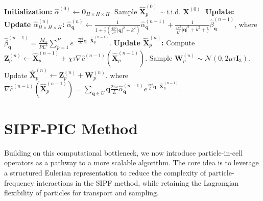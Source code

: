 \documentclass[review,onefignum,onetabnum]{siamart250211}
\begin{document}
\begin{algorithm}
\caption{The SIPF method developed in \cite{SIPF1}}\label{Alg:SIPF}
\begin{algorithmic}[1]
\State \textbf{Initialization:}
\State \(\hat{\alpha}^{(0)} \gets \mathbf{0}_{H \times H \times H}\). 
\State Sample \(\widehat{\mathbf{X}}_p^{(0)} \sim \text{i.i.d. } \mathbf{X}^{(0)}\). 
\Statex
\State \textbf{Update:}
    \State \textbf{Update \(\hat{\alpha}^{(n)}_{H \times H \times H}\):}
    \State \(\hat{\alpha}_{\mathbf{q}}^{(n)} \gets \frac{1}{1 + \frac{\tau}{\epsilon}\left(\frac{4\pi^2}{L^2}|\mathbf{q}|^2 + k^2\right)} \hat{\alpha}_{\mathbf{q}}^{(n-1)} + \frac{1}{\frac{4\pi^2}{L^2}|\mathbf{q}|^2 + k^2 + \frac{\epsilon}{\tau}} \hat{\beta}_{\mathbf{q}}^{(n-1)}\),
    \State where \(\hat{\beta}_{\mathbf{q}}^{(n-1)} = \frac{M_0}{PL^3} \sum_{p=1}^{P} e^{-\frac{2\pi i}{L}\mathbf{q} \cdot \widehat{\mathbf{X}}_p^{(n-1)}}\).
    \Statex
    \State \textbf{Update \(\widehat{\mathbf{X}}_p^{(n)}\):}
        \State Compute \(\mathbf{Z}_p^{(n)} \gets \widehat{\mathbf{X}}_p^{(n-1)} + \chi \tau \nabla \hat{c}^{(n-1)}(\widehat{\mathbf{X}}_p^{(n-1)})\).
        \State Sample \(\mathbf{W}_p^{(n)} \sim \mathcal{N}(0, 2\mu \tau \mathbf{I}_3)\). 
        \State Update \(\widehat{\mathbf{X}}_p^{(n)} \gets \mathbf{Z}_p^{(n)} + \mathbf{W}_p^{(n)}\).
    \EndFor
    \State \hspace{0.5cm} where \(\nabla \hat{c}^{(n-1)}(\widehat{\mathbf{X}}_p^{(n-1)}) = \sum_{\mathbf{q} \in U}  \mathbf{q} \frac{2\pi i}{L} \hat{\alpha}^{(n-1)}_{ \mathbf{q}} e^{\frac{2\pi i}{L} \mathbf{q} \cdot \widehat{\mathbf{X}}_p^{(n-1)}}\). 
\EndFor
\end{algorithmic}
\end{algorithm}
  


\section{SIPF-PIC Method}
Building on this computational bottleneck, we now introduce particle-in-cell operators as a pathway to a more scalable algorithm. The core idea is to leverage a structured Eulerian representation to reduce the complexity of particle-frequency interactions in the SIPF method, while retaining the Lagrangian flexibility of particles for transport and sampling.
\end{document}

